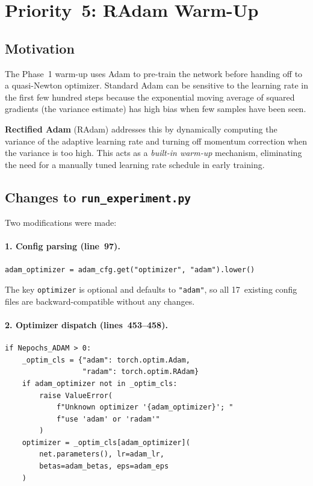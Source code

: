 \documentclass[11pt,a4paper]{article}
\begin{document}
\section{Priority~5: RAdam Warm-Up}
\label{sec:radam}

\subsection{Motivation}

The Phase~1 warm-up uses Adam \cite{kingma2015} to pre-train the
network before handing off to a quasi-Newton optimizer.  Standard Adam
can be sensitive to the learning rate in the first few hundred steps
because the exponential moving average of squared gradients (the
variance estimate) has high bias when few samples have been seen.

\textbf{Rectified Adam} (RAdam) \cite{liu2020} addresses this by
dynamically computing the variance of the adaptive learning rate and
turning off momentum correction when the variance is too high.  This
acts as a \emph{built-in warm-up} mechanism, eliminating the need for
a manually tuned learning rate schedule in early training.

\subsection{Changes to \texttt{run\_experiment.py}}

Two modifications were made:

\paragraph{1. Config parsing (line~97).}
\begin{lstlisting}[caption={New config key for optimizer selection}]
adam_optimizer = adam_cfg.get("optimizer", "adam").lower()
\end{lstlisting}
The key \texttt{optimizer} is optional and defaults to \texttt{"adam"},
so all 17~existing config files are backward-compatible without any
changes.

\paragraph{2. Optimizer dispatch (lines~453--458).}
\begin{lstlisting}[caption={RAdam / Adam dispatch}]
if Nepochs_ADAM > 0:
    _optim_cls = {"adam": torch.optim.Adam,
                  "radam": torch.optim.RAdam}
    if adam_optimizer not in _optim_cls:
        raise ValueError(
            f"Unknown optimizer '{adam_optimizer}'; "
            f"use 'adam' or 'radam'"
        )
    optimizer = _optim_cls[adam_optimizer](
        net.parameters(), lr=adam_lr,
        betas=adam_betas, eps=adam_eps
    )
\end{lstlisting}
\end{document}
